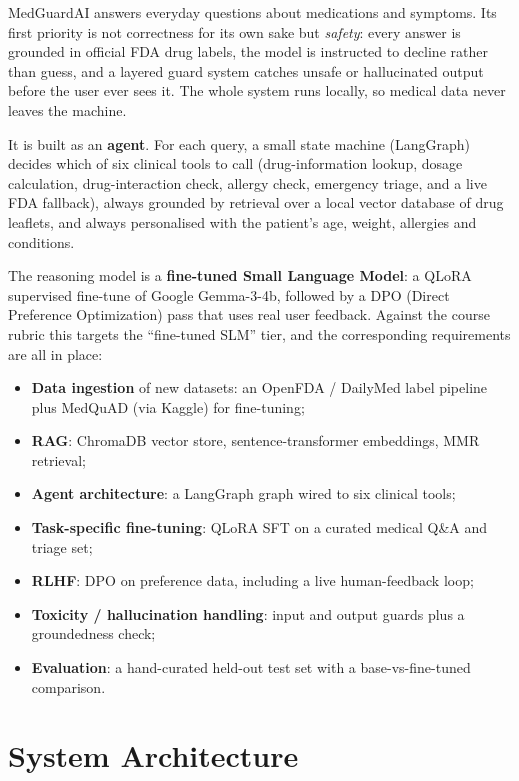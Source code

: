 \documentclass[11pt,a4paper]{article}
\begin{document}
MedGuardAI answers everyday questions about medications and symptoms. Its first priority is not
correctness for its own sake but \emph{safety}: every answer is grounded in official FDA drug labels,
the model is instructed to decline rather than guess, and a layered guard system catches unsafe or
hallucinated output before the user ever sees it. The whole system runs locally, so medical data
never leaves the machine.

It is built as an \textbf{agent}. For each query, a small state machine (LangGraph) decides which of
six clinical tools to call (drug-information lookup, dosage calculation, drug-interaction
check, allergy check, emergency triage, and a live FDA fallback), always grounded by
retrieval over a local vector database of drug leaflets, and always personalised with the patient's
age, weight, allergies and conditions.

The reasoning model is a \textbf{fine-tuned Small Language Model}: a QLoRA supervised fine-tune of
Google Gemma-3-4b, followed by a DPO (Direct Preference Optimization) pass that uses real user
feedback. Against the course rubric this targets the ``fine-tuned SLM'' tier, and the corresponding
requirements are all in place:

\begin{itemize}[leftmargin=1.4em,itemsep=2pt,topsep=3pt]
  \item \textbf{Data ingestion} of new datasets: an OpenFDA / DailyMed label pipeline plus MedQuAD (via Kaggle) for fine-tuning;
  \item \textbf{RAG}: ChromaDB vector store, sentence-transformer embeddings, MMR retrieval;
  \item \textbf{Agent architecture}: a LangGraph graph wired to six clinical tools;
  \item \textbf{Task-specific fine-tuning}: QLoRA SFT on a curated medical Q\&A and triage set;
  \item \textbf{RLHF}: DPO on preference data, including a live human-feedback loop;
  \item \textbf{Toxicity / hallucination handling}: input and output guards plus a groundedness check;
  \item \textbf{Evaluation}: a hand-curated held-out test set with a base-vs-fine-tuned comparison.
\end{itemize}

\section{System Architecture}
\end{document}
